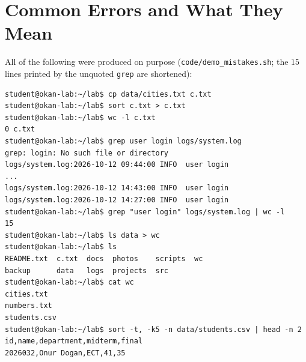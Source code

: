 \documentclass[11pt,a4paper]{article}
\newcommand{\cmd}[1]{\texttt{#1}}
\begin{document}
\section{Common Errors and What They Mean}
\label{sec:errors}

All of the following were produced on purpose (\cmd{code/demo\_mistakes.sh}; the $15$ lines printed by the unquoted \cmd{grep} are shortened):

\begin{lstlisting}[style=term]
student@okan-lab:~/lab$ cp data/cities.txt c.txt
student@okan-lab:~/lab$ sort c.txt > c.txt
student@okan-lab:~/lab$ wc -l c.txt
0 c.txt
student@okan-lab:~/lab$ grep user login logs/system.log
grep: login: No such file or directory
logs/system.log:2026-10-12 09:44:00 INFO  user login
...
logs/system.log:2026-10-12 14:43:00 INFO  user login
logs/system.log:2026-10-12 14:27:00 INFO  user login
student@okan-lab:~/lab$ grep "user login" logs/system.log | wc -l
15
student@okan-lab:~/lab$ ls data > wc
student@okan-lab:~/lab$ ls
README.txt  c.txt  docs  photos    scripts  wc
backup      data   logs  projects  src
student@okan-lab:~/lab$ cat wc
cities.txt
numbers.txt
students.csv
student@okan-lab:~/lab$ sort -t, -k5 -n data/students.csv | head -n 2
id,name,department,midterm,final
2026032,Onur Dogan,ECT,41,35
\end{lstlisting}
\end{document}
